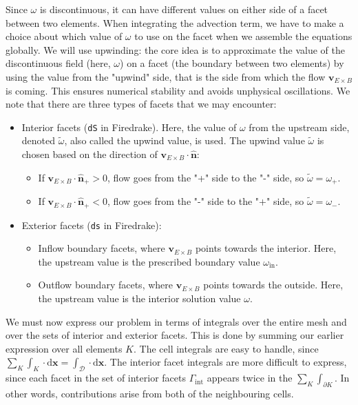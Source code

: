 \documentclass[12pt]{article}
\begin{document}
Since $\omega$ is discontinuous, it can have different values on either side of a facet between two elements. When integrating the advection term, we have to make a choice about which value of $\omega$ to use on the facet when we assemble the equations globally. We will use upwinding: the core idea is to approximate the value of the discontinuous field (here, $\omega$) on a facet (the boundary between two elements) by using the value from the "upwind" side, that is the side from which the flow $\bm{v}_{E \times B}$ is coming. This ensures numerical stability and avoids unphysical oscillations. We note that there are three types of facets that we may encounter:
%
\begin{itemize}
    \item Interior facets (\texttt{dS} in Firedrake). Here, the value of $\omega$ from the upstream side, denoted $\tilde{\omega}$, also called the upwind value, is used. The upwind value $\tilde{\omega}$ is chosen based on the direction of $\bm{v}_{E \times B} \cdot \hat{\bm{n}}$:
    \begin{itemize}
        \item If $\bm{v}_{E \times B} \cdot \hat{\bm{n}}_+ > 0$, flow goes from the "+" side to the "-" side, so $\tilde{\omega} = \omega_+$.
        \item If $\bm{v}_{E \times B} \cdot \hat{\bm{n}}_+ < 0$, flow goes from the "-" side to the "+" side, so $\tilde{\omega} = \omega_-$.
    \end{itemize}
    \item Exterior facets (\texttt{ds} in Firedrake):
    \begin{itemize}
        \item Inflow boundary facets, where $\bm{v}_{E \times B}$ points towards the interior. Here, the upstream value is the prescribed boundary value $\omega_\text{in}$.
        \item Outflow boundary facets, where $\bm{v}_{E \times B}$ points towards the outside. Here, the upstream value is the interior solution value $\omega$.
    \end{itemize}
\end{itemize}
%
We must now express our problem in terms of integrals over the entire mesh and over the sets of interior and exterior facets. This is done by summing our earlier expression over all elements $K$. The cell integrals are easy to handle, since $\sum_K \int_K \cdot \mathrm{d}\bm{x} = \int_\mathcal{D} \cdot \mathrm{d}\bm{x}$. The interior facet integrals are more difficult to express, since each facet in the set of interior facets $\Gamma_\text{int}$ appears twice in the $\sum_K \int_{\partial K}$. In other words, contributions arise from both of the neighbouring cells.
\end{document}
